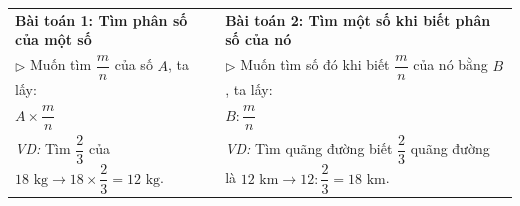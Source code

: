 \documentclass[14pt,a4paper,oneside]{extbook}
\begin{document}
\vspace{3mm}

\noindent
\begin{tcolorbox}[
  enhanced,
  title={\footnotesize\bfseries\color{white}\faCheckSquareO\ 3. Hai bài toán phân số kinh điển cần phân biệt rạch ròi},
  colback=purple!2!white,
  colframe=purple!70!black,
  arc=2.5mm, boxrule=0.8pt, top=1.8mm, bottom=1.8mm, left=2.5mm, right=2.5mm
]
  \footnotesize
  \begin{tabular}{p{}|p{}}
    \textbf{Bài toán 1: Tìm phân số của một số} & \textbf{Bài toán 2: Tìm một số khi biết phân số của nó} \\
    $\triangleright$ Muốn tìm $\dfrac{m}{n}$ của số $A$, ta lấy: & $\triangleright$ Muốn tìm số đó khi biết $\dfrac{m}{n}$ của nó bằng $B$, ta lấy: \\
    \centering\textbf{\color{purple!90!black}$A \times \dfrac{m}{n}$} & \centering\textbf{\color{blue!90!black}$B : \dfrac{m}{n}$} \\[2pt]
    \textit{VD:} Tìm $\dfrac{2}{3}$ của $18\text{ kg} \rightarrow 18 \times \dfrac{2}{3} = 12\text{ kg}$. & \textit{VD:} Tìm quãng đường biết $\dfrac{2}{3}$ quãng đường là $12\text{ km} \rightarrow 12 : \dfrac{2}{3} = 18\text{ km}$.
  \end{tabular}
\end{tcolorbox}

\vspace{3mm}
\end{document}
